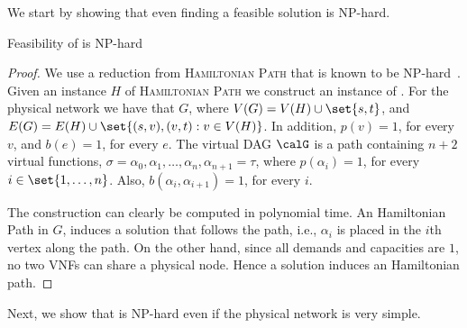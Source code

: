We start by showing that even finding a feasible solution is NP-hard.

\begin{theorem}
Feasibility of \scp is NP-hard
\end{theorem}
\begin{proof}
We use a reduction from \textsc{Hamiltonian Path} that is known to be
NP-hard~\cite{GarJoh79}.
%
Given an instance $H$ of \textsc{Hamiltonian Path} we construct an
instance of \scp.  For the physical network we have that $G$, where
$V(G) = V(H) \cup \set{s,t}$, and $E(G) = E(H) \cup \set{(s,v),(v,t) :
  v \in V(H)}$.  In addition, $p(v) = 1$, for every $v$, and $b(e) =
1$, for every $e$.  The virtual DAG $\calG$ is a path containing $n+2$
virtual functions, $\sigma = \alpha_0, \alpha_1, \ldots, \alpha_n,
\alpha_{n+1} = \tau$, where $p(\alpha_i) = 1$, for every $i \in
\set{1,\ldots,n}$.  Also, $b(\alpha_i,\alpha_{i+1}) = 1$, for every
$i$.

The construction can clearly be computed in polynomial time.
%
An Hamiltonian Path in $G$, induces a \scp solution that follows the
path, i.e., $\alpha_i$ is placed in the $i$th vertex along the path.
%
On the other hand, since all demands and capacities are $1$, no two
VNFs can share a physical node.  Hence a \scp solution induces an
Hamiltonian path.
\end{proof}

Next, we show that \scp is NP-hard even if the physical network is
very simple. 

